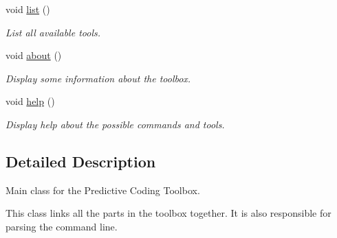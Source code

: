 \begin{DoxyCompactItemize}
\item 
\hypertarget{classpct_1_1_predictive_coding_toolbox_a31f5c4c3ac772439946afe29d1f7f05a}{void \hyperlink{classpct_1_1_predictive_coding_toolbox_a31f5c4c3ac772439946afe29d1f7f05a}{list} ()}\label{classpct_1_1_predictive_coding_toolbox_a31f5c4c3ac772439946afe29d1f7f05a}

\begin{DoxyCompactList}\small\item\em List all available tools. \end{DoxyCompactList}\item 
\hypertarget{classpct_1_1_predictive_coding_toolbox_a2100de159a77a995ce070a4386ba22c3}{void \hyperlink{classpct_1_1_predictive_coding_toolbox_a2100de159a77a995ce070a4386ba22c3}{about} ()}\label{classpct_1_1_predictive_coding_toolbox_a2100de159a77a995ce070a4386ba22c3}

\begin{DoxyCompactList}\small\item\em Display some information about the toolbox. \end{DoxyCompactList}\item 
\hypertarget{classpct_1_1_predictive_coding_toolbox_aae2b3ad3901c67fa61e9cd8b7c090b38}{void \hyperlink{classpct_1_1_predictive_coding_toolbox_aae2b3ad3901c67fa61e9cd8b7c090b38}{help} ()}\label{classpct_1_1_predictive_coding_toolbox_aae2b3ad3901c67fa61e9cd8b7c090b38}

\begin{DoxyCompactList}\small\item\em Display help about the possible commands and tools. \end{DoxyCompactList}\end{DoxyCompactItemize}


\subsection{Detailed Description}
Main class for the Predictive Coding Toolbox. 

This class links all the parts in the toolbox together. It is also responsible for parsing the command line. 

